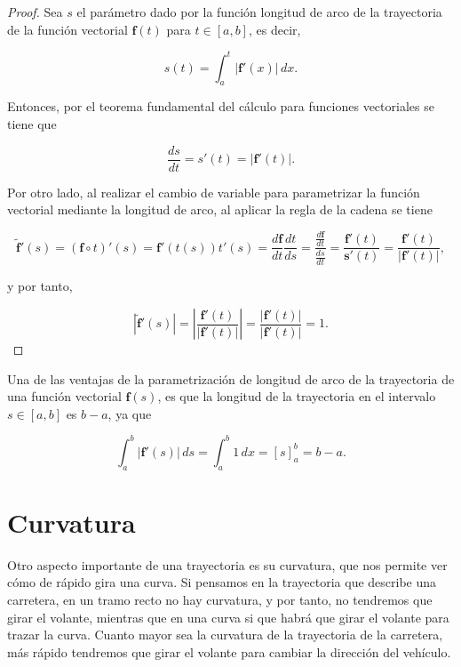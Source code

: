 \documentclass[
  a4paper,
]{scrreport}
\theoremstyle{definition}
\theoremstyle{plain}
\theoremstyle{definition}
\theoremstyle{definition}
\theoremstyle{plain}
\theoremstyle{plain}
\theoremstyle{remark}
\begin{document}
\begin{tcolorbox}[enhanced jigsaw, leftrule=.75mm, colbacktitle=quarto-callout-note-color!10!white, toprule=.15mm, opacityback=0, opacitybacktitle=0.6, toptitle=1mm, breakable, bottomtitle=1mm, colframe=quarto-callout-note-color-frame, rightrule=.15mm, titlerule=0mm, title=\textcolor{quarto-callout-note-color}{\faInfo}\hspace{0.5em}{Demostración}, arc=.35mm, left=2mm, bottomrule=.15mm, colback=white, coltitle=black]

\begin{proof}
Sea \(s\) el parámetro dado por la función longitud de arco de la
trayectoria de la función vectorial \(\mathbf{f}(t)\) para
\(t\in[a,b]\), es decir,

\[
s(t) = \int_a^t |\mathbf{f}'(x)|\, dx.
\]

Entonces, por el teorema fundamental del cálculo para funciones
vectoriales se tiene que

\[
\frac{ds}{dt} = s'(t) = |\mathbf{f}'(t)|.
\]

Por otro lado, al realizar el cambio de variable para parametrizar la
función vectorial mediante la longitud de arco, al aplicar la regla de
la cadena se tiene

\[
\tilde{\mathbf{f}}'(s) 
= (\mathbf{f}\circ t)'(s)
= \mathbf{f}'(t(s)) t'(s)
= \frac{d\mathbf{f}}{dt}\frac{dt}{ds}
= \frac{\frac{d\mathbf{f}}{dt}}{\frac{ds}{dt}}
= \frac{\mathbf{f}'(t)}{\mathbf{s}'(t)}
= \frac{\mathbf{f}'(t)}{|\mathbf{f}'(t)|},
\]

y por tanto,

\[
|\tilde{\mathbf{f}}'(s)| 
= \left|\frac{\mathbf{f}'(t)}{|\mathbf{f}'(t)|}\right|
= \frac{|\mathbf{f}'(t)|}{|\mathbf{f}'(t)|}
= 1.
\]
\end{proof}

\end{tcolorbox}

Una de las ventajas de la parametrización de longitud de arco de la
trayectoria de una función vectorial \(\mathbf{f}(s)\), es que la
longitud de la trayectoria en el intervalo \(s\in[a,b]\) es \(b-a\), ya
que

\[
\int_a^b |\mathbf{f}'(s)|\,ds = \int_a^b 1\,dx = [s]_a^b = b-a.
\]

\section{Curvatura}\label{curvatura}

Otro aspecto importante de una trayectoria es su curvatura, que nos
permite ver cómo de rápido gira una curva. Si pensamos en la trayectoria
que describe una carretera, en un tramo recto no hay curvatura, y por
tanto, no tendremos que girar el volante, mientras que en una curva si
que habrá que girar el volante para trazar la curva. Cuanto mayor sea la
curvatura de la trayectoria de la carretera, más rápido tendremos que
girar el volante para cambiar la dirección del vehículo.
\end{document}

